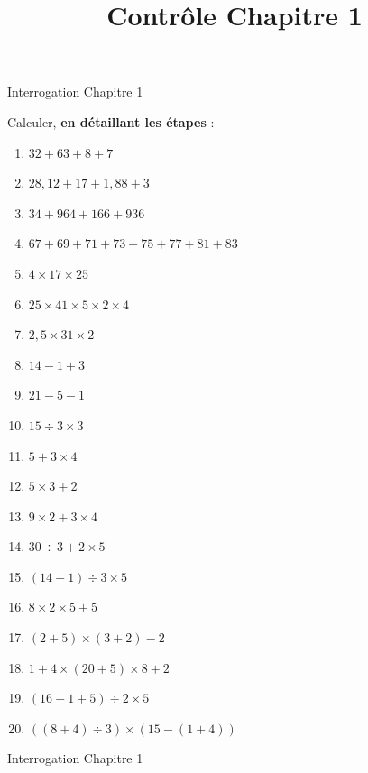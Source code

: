 \documentclass[14 pt]{extarticle}
\title{Contrôle Chapitre 1}
\date{}
\theoremstyle{plain}
\begin{document}
\begin{center}{\Large Interrogation Chapitre 1}\\ 
 \end{center}
 
 

Calculer, \textbf{en détaillant les étapes} : \begin{enumerate}
\item $32 + 63 + 8 + 7$
\item $28,12 + 17 + 1, 88 + 3$
\item $34 + 964 + 166 + 936$
\item $ 67 + 69 + 71 + 73 + 75 +77 +81 +83 $
\item $4 \times 17 \times 25$ 
\item $25 \times 41\times 5 \times 2 \times 4$
\item $ 2,5 \times 31 \times 2 $
\item $ 14 - 1 + 3$
\item $ 21 - 5 - 1$
\item $15\div 3 \times 3$
\item $5 + 3 \times 4$
\item $ 5 \times 3 + 2$
\item $ 9 \times 2 + 3 \times 4$
\item $ 30 \div 3 + 2 \times 5$
\item $ (14 +1)\div 3 \times 5$
\item $ 8 \times 2 \times 5 + 5$
\item $(2+5) \times (3+2) - 2$
\item $ 1 + 4 \times (20 + 5) \times 8 + 2$
\item $ (16 - 1 + 5)\div 2 \times 5$
\item $ ( ( 8 + 4 ) \div 3 ) \times ( 15 - ( 1 + 4 ) )$
\end{enumerate}


\newpage 

\begin{center}{\Large Interrogation Chapitre 1}\\ 
 \end{center}
 
 
\end{document}
